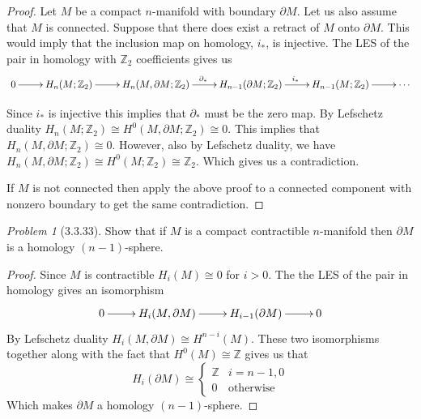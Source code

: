 \documentclass[10pt]{article}
\newcommand{\sk}{\vskip 10mm}
\newcommand{\bb}[1]{\mathbb{#1}}
\theoremstyle{remark}
\newtheorem{problem}{Problem}
\begin{document}
\begin{proof}
  Let $M$ be a compact $n$-manifold with boundary $\partial M$. Let us also assume
  that $M$ is connected. Suppose that there does exist a retract of $M$ onto $\partial M$.
  This would imply that the inclusion map on homology, $i_*$, is injective.
  The LES of the pair in homology with $\bb{Z}_2$ coefficients gives us
  \[
    \xymatrix{
      0 \ar[r] & H_n(M;\bb{Z}_2) \ar[r] & H_n(M,\partial M;\bb{Z}_2)\ar[r]^{\partial_*} & H_{n-1}(\partial M;\bb{Z}_2) \ar[r]^{i_*} & H_{n-1}(M;\bb{Z}_2)\ar[r] &\cdots
    }
  \]

  Since $i_*$ is injective this implies that $\partial_*$ must be the zero map.
  By Lefschetz duality $H_n(M;\bb{Z}_2)\cong H^0(M,\partial M;\bb{Z}_2)\cong 0$. This implies
  that $H_n(M,\partial M;\bb{Z}_2)\cong 0$. However, also by Lefschetz duality, we have
  $H_n(M,\partial M;\bb{Z}_2)\cong H^0(M;\bb{Z}_2)\cong \bb{Z}_2$. Which gives us a contradiction.

  If $M$ is not connected then apply the above proof to a connected component
  with nonzero boundary to get the same contradiction.
\end{proof}

\sk

\begin{problem}[3.3.33]
  Show that if $M$ is a compact contractible $n$-manifold then $\partial M$ is a
  homology $(n-1)$-sphere.
\end{problem}

\begin{proof}
  Since $M$ is contractible $H_i(M)\cong 0$ for $i>0$. The the LES of the pair in
  homology gives an isomorphism
  \[
    \xymatrix{
      0 \ar[r] & H_i(M,\partial M) \ar[r] & H_{i-1}(\partial M) \ar[r] & 0
    }
  \]
  By Lefschetz duality $H_i(M,\partial M)\cong H^{n-i}(M)$. These two isomorphisms together
  along with the fact that $H^0(M)\cong \bb{Z}$ gives us that
  \[
    H_i(\partial M) \cong
    \left\{
      \begin{array}{lr}
        \bb{Z} & i=n-1,0\\
        0 & \text{otherwise}
      \end{array}
    \right.
  \]
  Which makes $\partial M$ a homology $(n-1)$-sphere.
\end{proof}
\end{document}
